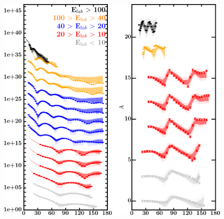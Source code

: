 \documentclass[twocolumn,secnumarabic,amssymb, nobibnotes, aps, prl,
superscriptaddress, nobalancelastpage]{revtex4}
\begin{document}
\begin{figure}[!htb]
    \centering
    \begin{minipage}{0.4\linewidth}
        \centering
        \includegraphics[width=\linewidth]{figures/ca48_protonElastic.png}
        \label{DOM_ca48_proton_elastic}
    \end{minipage}\hspace{6pt}
    \begin{minipage}{0.4\linewidth}
        \centering

\end{minipage}
\end{figure}
\end{document}
